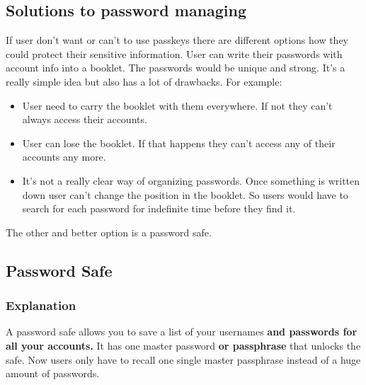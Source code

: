 \documentclass[conference]{IEEEtran}
\begin{document}
\subsection{Solutions to password managing}
If user don't want or can't to use passkeys there are different options how they could protect their sensitive information. User can write their passwords with account info into a booklet. The passwords would be unique and strong. It's a really simple idea but also has a lot of drawbacks. 
For example:
\begin{itemize}
\item User need to carry the booklet with them everywhere. If not they can't always access their accounts.
\item User can lose the booklet. If that happens they can't access any of their accounts any more.
\item It's not a really clear way of organizing passwords. Once something is written down user can't change the position in the booklet. So users would have to search for each password for indefinite time before they find it.
\end{itemize}
The other and better option is a password safe.  

\subsection{Password Safe}
\subsubsection{Explanation}
A password safe allows you to save a list of your usernames \textbf{and passwords for all your accounts.} It has one master password \textbf{or passphrase} that unlocks the safe. Now users only have to recall one single master passphrase instead of a huge amount of passwords.
\end{document}
